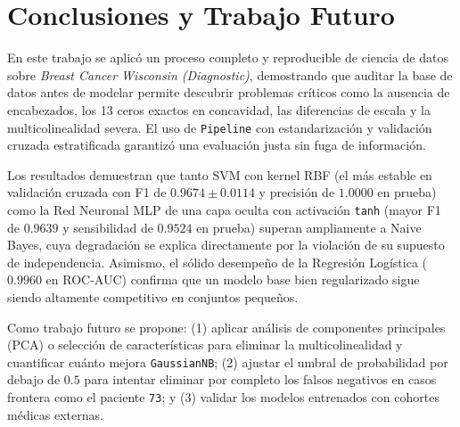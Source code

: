 \documentclass[conference]{IEEEtran}
\begin{document}
\section{Conclusiones y Trabajo Futuro}

En este trabajo se aplicó un proceso completo y reproducible de ciencia de datos sobre \textit{Breast Cancer Wisconsin (Diagnostic)}, demostrando que auditar la base de datos antes de modelar permite descubrir problemas críticos como la ausencia de encabezados, los 13 ceros exactos en concavidad, las diferencias de escala y la multicolinealidad severa. El uso de \texttt{Pipeline} con estandarización y validación cruzada estratificada garantizó una evaluación justa sin fuga de información.

Los resultados demuestran que tanto SVM con kernel RBF (el más estable en validación cruzada con F1 de $0.9674 \pm 0.0114$ y precisión de $1.0000$ en prueba) como la Red Neuronal MLP de una capa oculta con activación \texttt{tanh} (mayor F1 de $0.9639$ y sensibilidad de $0.9524$ en prueba) superan ampliamente a Naive Bayes, cuya degradación se explica directamente por la violación de su supuesto de independencia. Asimismo, el sólido desempeño de la Regresión Logística ($0.9960$ en ROC-AUC) confirma que un modelo base bien regularizado sigue siendo altamente competitivo en conjuntos pequeños.

Como trabajo futuro se propone: (1) aplicar análisis de componentes principales (PCA) o selección de características para eliminar la multicolinealidad y cuantificar cuánto mejora \texttt{GaussianNB}; (2) ajustar el umbral de probabilidad por debajo de $0.5$ para intentar eliminar por completo los falsos negativos en casos frontera como el paciente \texttt{73}; y (3) validar los modelos entrenados con cohortes médicas externas.

\balance


\end{document}
